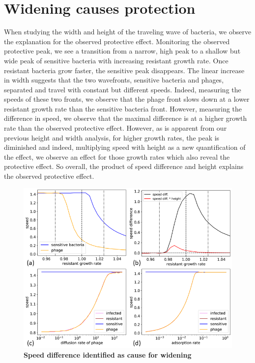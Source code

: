 \section{Widening causes protection}
When studying the width and height of the traveling wave of bacteria, we observe the explanation for the observed protective effect. Monitoring the observed protective peak, we see a transition from a narrow, high peak to a shallow but wide peak of sensitive bacteria with increasing resistant growth rate. Once resistant bacteria grow faster, the sensitive peak disappears. The linear increase in width suggests that the two wavefronts, sensitive bacteria and phages, separated and travel with constant but different speeds. Indeed, measuring the speeds of these two fronts, we observe that the phage front slows down at a lower resistant growth rate than the sensitive bacteria front. However, measuring the difference in speed, we observe that the maximal difference is at a higher growth rate than the observed protective effect. However, as is apparent from our previous height and width analysis, for higher growth rates, the peak is diminished and indeed, multiplying speed with height as a new quantification of the effect, we observe an effect for those growth rates which also reveal the protective effect. So overall, the product of speed difference and height explains the observed protective effect. 

\begin{figure}
\centering
\includegraphics[width=\linewidth]{graphics/2025_09_26_droplets_fig4.png}
\caption{\textbf{Speed difference identified as cause for widening}}
\label{fig:results_speed_height}
\end{figure}

